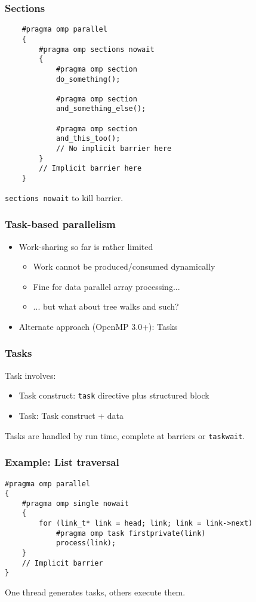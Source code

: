 \documentclass{beamer}
\begin{document}
\begin{frame}[fragile]
  \frametitle{Sections}

\begin{lstlisting}
    #pragma omp parallel
    {
        #pragma omp sections nowait
        {
            #pragma omp section
            do_something();

            #pragma omp section
            and_something_else();

            #pragma omp section
            and_this_too();
            // No implicit barrier here
        }
        // Implicit barrier here
    }
\end{lstlisting}
{\tt sections nowait} to kill barrier.
\end{frame}


\begin{frame}
  \frametitle{Task-based parallelism}

  \begin{itemize}
  \item Work-sharing so far is rather limited
    \begin{itemize}
    \item Work cannot be produced/consumed dynamically
    \item Fine for data parallel array processing...
    \item ... but what about tree walks and such?
    \end{itemize}
  \item Alternate approach (OpenMP 3.0+): Tasks
  \end{itemize}
\end{frame}


\begin{frame}
  \frametitle{Tasks}

  Task involves:
  \begin{itemize}
  \item Task construct: {\tt task} directive plus structured block
  \item Task: Task construct + data
  \end{itemize}
  Tasks are handled by run time, complete at barriers or {\tt taskwait}.
\end{frame}


\begin{frame}[fragile]
  \frametitle{Example: List traversal}

\begin{lstlisting}
#pragma omp parallel
{
    #pragma omp single nowait
    {
        for (link_t* link = head; link; link = link->next)
            #pragma omp task firstprivate(link)
            process(link);
    }
    // Implicit barrier
}
\end{lstlisting}
One thread generates tasks, others execute them.
\end{frame}
\end{document}
